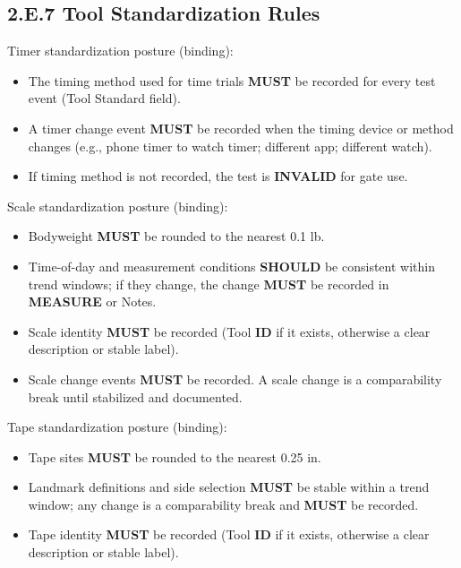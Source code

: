 \documentclass[10pt]{article}
\begin{document}
\subsection*{2.E.7 Tool Standardization Rules}
{}

Timer standardization posture (binding):

\begin{itemize}
\item The timing method used for time trials \textbf{MUST} be recorded for every test event (Tool Standard field).
\item A timer change event \textbf{MUST} be recorded when the timing device or method changes (e.g., phone timer to watch timer; different app; different watch).
\item If timing method is not recorded, the test is \textbf{INVALID} for gate use.
\end{itemize}

Scale standardization posture (binding):

\begin{itemize}
\item Bodyweight \textbf{MUST} be rounded to the nearest 0.1 lb.
\item Time-of-day and measurement conditions \textbf{SHOULD} be consistent within trend windows; if they change, the change \textbf{MUST} be recorded in \textbf{MEASURE} or Notes.
\item Scale identity \textbf{MUST} be recorded (Tool \textbf{ID} if it exists, otherwise a clear description or stable label).
\item Scale change events \textbf{MUST} be recorded. A scale change is a comparability break until stabilized and documented.
\end{itemize}

Tape standardization posture (binding):

\begin{itemize}
\item Tape sites \textbf{MUST} be rounded to the nearest 0.25 in.
\item Landmark definitions and side selection \textbf{MUST} be stable within a trend window; any change is a comparability break and \textbf{MUST} be recorded.
\item Tape identity \textbf{MUST} be recorded (Tool \textbf{ID} if it exists, otherwise a clear description or stable label).
\end{itemize}
\end{document}
